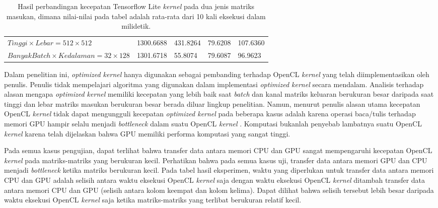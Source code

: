 \begin{table}
	\centering
	\caption{Hasil perbandingan kecepatan Tensorflow Lite \textit{kernel} pada dua jenis matriks masukan, dimana nilai-nilai pada tabel adalah rata-rata dari 10 kali eksekusi dalam milidetik.}
	\label{tab:hwvsbcspeed}
\begin{tabular}{|>{\small}R{2.5cm}|>{\small}R{2.1cm}|>{\small}R{2.1cm}|>{\small}R{2.1cm}|>{\small}R{2.4cm}|}
	\hline
	 & 
	 & 
	 & 
	 & 
	 \\
	\hline
		$Tinggi \times Lebar = 512 \times 512$ & 1300.6688 & 431.8264 & 79.6208 & 107.6360
		\\
		\hline
		$Banyak Batch \times Kedalaman = 32 \times 128$ & 1301.6718 & 55.8074 & 79.6087 & 96.9623
		\\
		\hline
	\end{tabular}
\end{table}

Dalam penelitian ini, \textit{optimized kernel} hanya digunakan sebagai pembanding terhadap OpenCL \textit{kernel} yang telah diimplementasikan oleh penulis. Penulis tidak mempelajari algoritma yang digunakan dalam implementasi \textit{optimized kernel} secara mendalam. Analisis terhadap alasan mengapa \textit{optimized kernel} memiliki kecepatan yang lebih baik saat \textit{batch} dan kanal matriks keluaran berukuran besar daripada saat tinggi dan lebar matriks masukan berukuran besar berada diluar lingkup penelitian. Namun, menurut penulis alasan utama kecepatan OpenCL \textit{kernel} tidak dapat mengungguli kecepatan \textit{optimized kernel} pada beberapa kasus adalah karena operasi baca/tulis terhadap memori GPU hampir selalu menjadi \textit{bottleneck} dalam suatu OpenCL \textit{kernel} \cite{adrenoopencl}. Komputasi bukanlah penyebab lambatnya suatu OpenCL \textit{kernel} karena telah dijelaskan bahwa GPU memiliki performa komputasi yang sangat tinggi.

Pada semua kasus pengujian, dapat terlihat bahwa transfer data antara memori CPU dan GPU sangat mempengaruhi kecepatan OpenCL \textit{kernel} pada matriks-matriks yang berukuran kecil. Perhatikan bahwa pada semua kasus uji, transfer data antara memori GPU dan CPU menjadi \textit{bottleneck} ketika matriks berukuran kecil. Pada tabel hasil eksperimen, waktu yang diperlukan untuk transfer data antara memori CPU dan GPU adalah selisih antara waktu eksekusi OpenCL \textit{kernel} saja dengan waktu eksekusi OpenCL \textit{kernel} ditambah transfer data antara memori CPU dan GPU (selisih antara kolom keempat dan kolom kelima). Dapat dilihat bahwa selisih tersebut lebih besar daripada waktu eksekusi OpenCL \textit{kernel} saja ketika matriks-matriks yang terlibat berukuran relatif kecil. 


